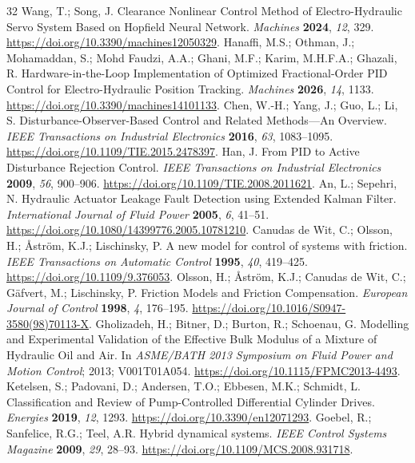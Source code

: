 \begin{thebibliography}{32}
 Wang, T.; Song, J. Clearance Nonlinear Control Method of Electro-Hydraulic Servo System Based on Hopfield Neural Network. \emph{Machines} \textbf{2024}, \emph{12}, 329. \url{https://doi.org/10.3390/machines12050329}.
 Hanaffi, M.S.; Othman, J.; Mohamaddan, S.; Mohd Faudzi, A.A.; Ghani, M.F.; Karim, M.H.F.A.; Ghazali, R. Hardware-in-the-Loop Implementation of Optimized Fractional-Order PID Control for Electro-Hydraulic Position Tracking. \emph{Machines} \textbf{2026}, \emph{14}, 1133. \url{https://doi.org/10.3390/machines14101133}.
 Chen, W.-H.; Yang, J.; Guo, L.; Li, S. Disturbance-Observer-Based Control and Related Methods---An Overview. \emph{IEEE Transactions on Industrial Electronics} \textbf{2016}, \emph{63}, 1083--1095. \url{https://doi.org/10.1109/TIE.2015.2478397}.
 Han, J. From PID to Active Disturbance Rejection Control. \emph{IEEE Transactions on Industrial Electronics} \textbf{2009}, \emph{56}, 900--906. \url{https://doi.org/10.1109/TIE.2008.2011621}.
 An, L.; Sepehri, N. Hydraulic Actuator Leakage Fault Detection using Extended Kalman Filter. \emph{International Journal of Fluid Power} \textbf{2005}, \emph{6}, 41--51. \url{https://doi.org/10.1080/14399776.2005.10781210}.
 Canudas de Wit, C.; Olsson, H.; \AA{}str\"om, K.J.; Lischinsky, P. A new model for control of systems with friction. \emph{IEEE Transactions on Automatic Control} \textbf{1995}, \emph{40}, 419--425. \url{https://doi.org/10.1109/9.376053}.
 Olsson, H.; \AA{}str\"om, K.J.; Canudas de Wit, C.; G\"afvert, M.; Lischinsky, P. Friction Models and Friction Compensation. \emph{European Journal of Control} \textbf{1998}, \emph{4}, 176--195. \url{https://doi.org/10.1016/S0947-3580(98)70113-X}.
 Gholizadeh, H.; Bitner, D.; Burton, R.; Schoenau, G. Modelling and Experimental Validation of the Effective Bulk Modulus of a Mixture of Hydraulic Oil and Air. In \emph{ASME/BATH 2013 Symposium on Fluid Power and Motion Control}; 2013; V001T01A054. \url{https://doi.org/10.1115/FPMC2013-4493}.
 Ketelsen, S.; Padovani, D.; Andersen, T.O.; Ebbesen, M.K.; Schmidt, L. Classification and Review of Pump-Controlled Differential Cylinder Drives. \emph{Energies} \textbf{2019}, \emph{12}, 1293. \url{https://doi.org/10.3390/en12071293}.
 Goebel, R.; Sanfelice, R.G.; Teel, A.R. Hybrid dynamical systems. \emph{IEEE Control Systems Magazine} \textbf{2009}, \emph{29}, 28--93. \url{https://doi.org/10.1109/MCS.2008.931718}.

\end{thebibliography}
